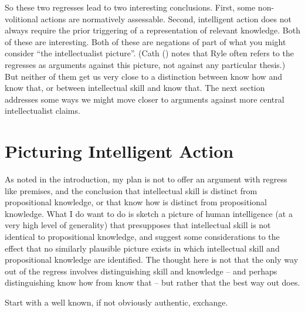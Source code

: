 \documentclass[
  11pt,
  letterpaper,
  DIV=11,
  numbers=noendperiod,
  oneside]{scrartcl}
\begin{document}
So these two regresses lead to two interesting conclusions. First, some
non-volitional actions are normatively assessable. Second, intelligent
action does not always require the prior triggering of a representation
of relevant knowledge. Both of these are interesting. Both of these are
negations of part of what you might consider ``the intellectualist
picture''. (Cath () notes that Ryle often
refers to the regresses as arguments against this picture, not against
any particular thesis.) But neither of them get us very close to a
distinction between know how and know that, or between intellectual
skill and know that. The next section addresses some ways we might move
closer to arguments against more central intellectualist claims.

\section{Picturing Intelligent
Action}\label{picturing-intelligent-action}

As noted in the introduction, my plan is not to offer an argument with
regress like premises, and the conclusion that intellectual skill is
distinct from propositional knowledge, or that know how is distinct from
propositional knowledge. What I do want to do is sketch a picture of
human intelligence (at a very high level of generality) that presupposes
that intellectual skill is not identical to propositional knowledge, and
suggest some considerations to the effect that no similarly plausible
picture exists in which intellectual skill and propositional knowledge
are identified. The thought here is not that the only way out of the
regress involves distinguishing skill and knowledge -- and perhaps
distinguishing know how from know that -- but rather that the best way
out does.

Start with a well known, if not obviously authentic,
exchange.
\end{document}
